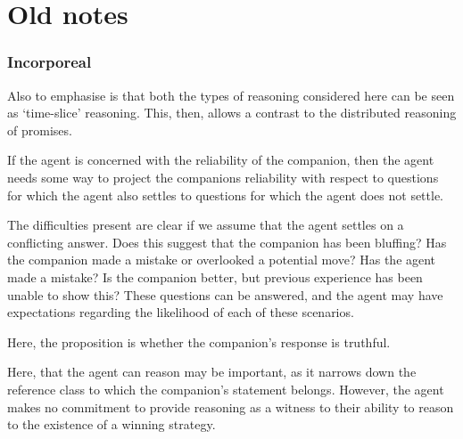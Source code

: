 \documentclass[10pt]{article}
\begin{document}
\section{Old notes}
\label{sec:old-notes}



\subsubsection{Incorporeal}
\label{sec:incorporeal}

\begin{note}
  Also to emphasise is that both the types of reasoning considered here can be seen as `time-slice' reasoning.
  This, then, allows a contrast to the distributed reasoning of promises.
\end{note}

If the agent is concerned with the reliability of the companion, then the agent needs some way to project the companions reliability with respect to questions for which the agent also settles to questions for which the agent does not settle.

The difficulties present are clear if we assume that the agent settles on a conflicting answer.
Does this suggest that the companion has been bluffing?
Has the companion made a mistake or overlooked a potential move?
Has the agent made a mistake?
Is the companion better, but previous experience has been unable to show this?
These questions can be answered, and the agent may have expectations regarding the likelihood of each of these scenarios.

Here, the proposition is whether the companion's response is truthful.

Here, that the agent can reason may be important, as it narrows down the reference class to which the companion's statement belongs.
However, the agent makes no commitment to provide reasoning as a witness to their ability to reason to the existence of a winning strategy.
\end{document}
